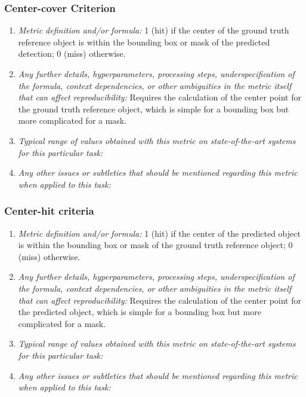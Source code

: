 \documentclass[a4paper,11pt]{article}
\begin{document}
    \subsubsection{Center-cover Criterion}
        \begin{enumerate}[label=\alph*.]
            \item \textit{Metric definition and/or formula:} 1 (hit) if the center of the ground truth reference object is within the bounding box or mask of the predicted detection; 0 (miss) otherwise.
            \bigskip
            \item \textit{Any further details, hyperparameters, processing steps, underspecification of the formula, context dependencies, or other ambiguities in the metric itself that can affect reproducibility:} Requires the calculation of the center point for the ground truth reference object, which is simple for a bounding box but more complicated for a mask.
            \bigskip
            \item \textit{Typical range of values obtained with this metric on state-of-the-art systems for this particular task:}
            \bigskip
            \item \textit{Any other issues or subtleties that should be mentioned regarding this metric when applied to this task:}
            \bigskip
        \end{enumerate}

    \subsubsection{Center-hit criteria}
        \begin{enumerate}[label=\alph*.]
            \item \textit{Metric definition and/or formula:} 1 (hit) if the center of the predicted object is within the bounding box or mask of the ground truth reference object; 0 (miss) otherwise.
            \bigskip
            \item \textit{Any further details, hyperparameters, processing steps, underspecification of the formula, context dependencies, or other ambiguities in the metric itself that can affect reproducibility:} Requires the calculation of the center point for the predicted object, which is simple for a bounding box but more complicated for a mask.
            \bigskip
            \item \textit{Typical range of values obtained with this metric on state-of-the-art systems for this particular task:}
            \bigskip
            \item \textit{Any other issues or subtleties that should be mentioned regarding this metric when applied to this task:}
            \bigskip
        \end{enumerate}
    
\end{document}
